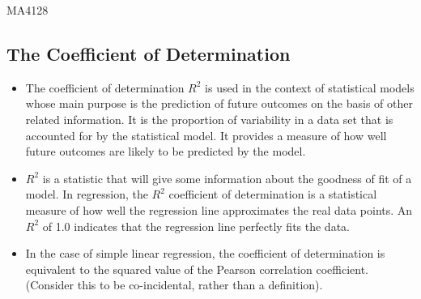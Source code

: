 \documentclass[]{report}
\begin{document}
MA4128

\subsection{The Coefficient of Determination}
\begin{itemize}
\item The coefficient of determination $R^2$ is used in the context of statistical models whose main
purpose is the prediction of future outcomes on the basis of other related information. It
is the proportion of variability in a data set that is accounted for by the statistical model.
It provides a measure of how well future outcomes are likely to be predicted by the model.
\item $R^2$ is a statistic that will give some information about the goodness of fit of a model.
In regression, the $R^2$ coefficient of determination is a statistical measure of how well
the regression line approximates the real data points. An $R^2$ of 1.0 indicates that the
regression line perfectly fits the data.
\item In the case of simple linear regression, the coefficient of determination is equivalent to the
squared value of the Pearson correlation coefficient. (Consider this to be co-incidental,
rather than a definition).
\end{itemize}
\end{document}

